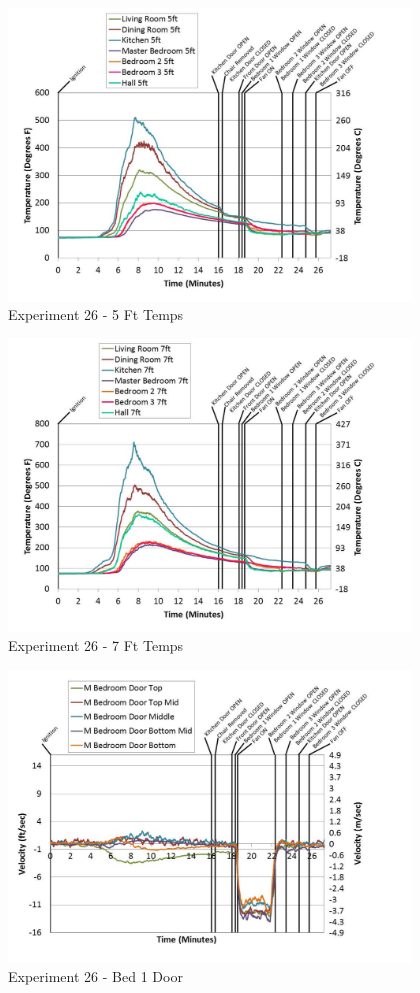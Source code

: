 \documentclass{article}
\begin{document}
\begin{appendices}
	\begin{figure}[h!]
		\centering
		\includegraphics[height=3.05in]{0_Images/Results_Charts/Exp_26_Charts/5FtTemps.pdf}
		\caption{Experiment 26 - 5 Ft Temps}
	\end{figure}
 

	\begin{figure}[h!]
		\centering
		\includegraphics[height=3.05in]{0_Images/Results_Charts/Exp_26_Charts/7FtTemps.pdf}
		\caption{Experiment 26 - 7 Ft Temps}
	\end{figure}
 
	\clearpage

	\begin{figure}[h!]
		\centering
		\includegraphics[height=3.05in]{0_Images/Results_Charts/Exp_26_Charts/Bed1Door.pdf}
		\caption{Experiment 26 - Bed 1 Door}
	\end{figure}
 


\end{appendices}
\end{document}
